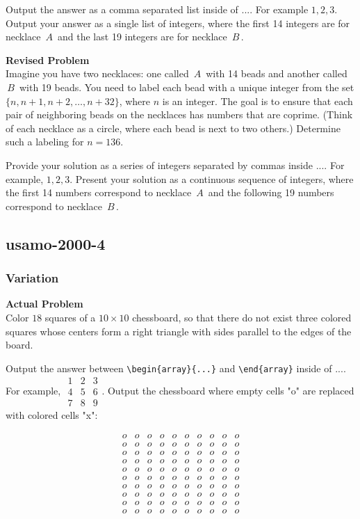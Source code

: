 Output the answer as a comma separated list inside of $\boxed{...}$. For example $\boxed{1, 2, 3}$.
Output your answer as a single list of integers, where the first 14 integers are for necklace $\, A \,$ and the last 19 integers are for necklace $\, B \,$.

\textbf{Revised Problem}\\
Imagine you have two necklaces: one called $\, A \,$ with 14 beads and another called $\, B \,$ with 19 beads. You need to label each bead with a unique integer from the set $\{ n, n+1, n+2, \dots, n+32 \}$, where $n$ is an integer. The goal is to ensure that each pair of neighboring beads on the necklaces has numbers that are coprime. (Think of each necklace as a circle, where each bead is next to two others.) Determine such a labeling for $n = 136$.

Provide your solution as a series of integers separated by commas inside $\boxed{...}$. For example, $\boxed{1, 2, 3}$. Present your solution as a continuous sequence of integers, where the first 14 numbers correspond to necklace $\, A \,$ and the following 19 numbers correspond to necklace $\, B \,$.

\subsection{usamo-2000-4}
\subsubsection{Variation}
\textbf{Actual Problem}\\
Color $18$ squares of a $10 \times 10$ chessboard, so that there do not exist three colored squares whose centers form a right triangle with sides parallel to the edges of the board.

Output the answer between \verb|\begin{array}{...}| and \verb|\end{array}| inside of $\boxed{...}$. For example, $\boxed{\begin{array}{ccc}1 & 2 & 3 \\ 4 & 5 & 6 \\ 7 & 8 & 9\end{array}}$.
Output the chessboard where empty cells "o" are replaced with colored cells "x":

$$\begin{array}{cccccccccc}
o & o & o & o & o & o & o & o & o & o \\
o & o & o & o & o & o & o & o & o & o \\
o & o & o & o & o & o & o & o & o & o \\
o & o & o & o & o & o & o & o & o & o \\
o & o & o & o & o & o & o & o & o & o \\
o & o & o & o & o & o & o & o & o & o \\
o & o & o & o & o & o & o & o & o & o \\
o & o & o & o & o & o & o & o & o & o \\
o & o & o & o & o & o & o & o & o & o \\
o & o & o & o & o & o & o & o & o & o \\
\end{array}$$


